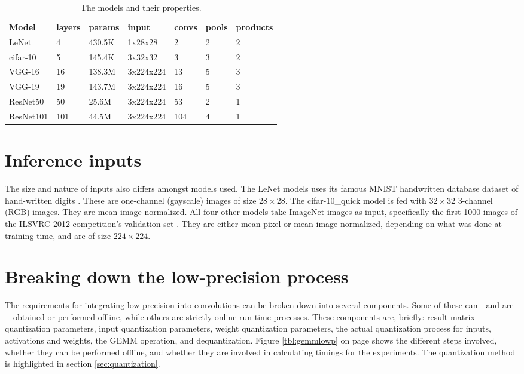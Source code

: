 \begin{table}[]
\centering
\caption[Model properties]{The models and their properties.}
\label{tbl:models}
\begin{tabular}{lllllll}
\textbf{Model}     & \textbf{layers} & \textbf{params} & \textbf{input} & \textbf{convs} & \textbf{pools} & \textbf{products} \\
LeNet     & 4               & 430.5K          & 1x28x28        & 2              & 2              & 2                 \\
cifar-10  & 5               & 145.4K          & 3x32x32        & 3              & 3              & 2                 \\
VGG-16    & 16              & 138.3M          & 3x224x224      & 13             & 5              & 3                 \\
VGG-19    & 19              & 143.7M          & 3x224x224      & 16             & 5              & 3                 \\
ResNet50  & 50              & 25.6M           & 3x224x224      & 53             & 2              & 1                 \\
ResNet101 & 101             & 44.5M           & 3x224x224      & 104            & 4              & 1                
\end{tabular}
\end{table}

\section{Inference inputs}
The size and nature of inputs also differs amongst models used. The LeNet models uses its famous MNIST handwritten database dataset of hand-written digits \cite{mnist}. These are one-channel (gayscale) images of size $28\times28$. The cifar-10\_quick model is fed with $32\times32$ 3-channel (RGB) images. They are mean-image normalized. All four other models take ImageNet images as input, specifically the first 1000 images of the ILSVRC 2012 competition's validation set \cite{imagenet}. They are either mean-pixel or mean-image normalized, depending on what was done at training-time, and are of size $224\times224$.

\section{Breaking down the low-precision process}
The requirements for integrating low precision into convolutions can be broken down into several components. Some of these can---and are---obtained or performed offline, while others are strictly online run-time processes. These components are, briefly: result matrix quantization parameters, input quantization parameters, weight quantization parameters, the actual quantization process for inputs, activations and weights, the GEMM operation, and dequantization. Figure \ref{tbl:gemmlowp} on page \pageref{tbl:gemmlowp} shows the different steps involved, whether they can be performed offline, and whether they are involved in calculating timings for the experiments. The quantization method is highlighted in section \ref{sec:quantization}.

